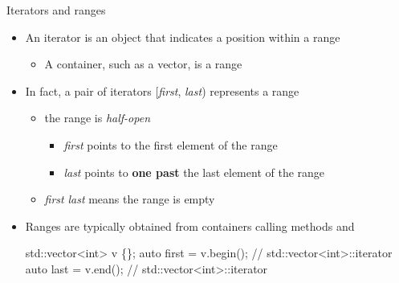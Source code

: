 \begin{frame}[fragile]{Iterators and ranges}
  \begin{itemize}
  \item An \alert{iterator} is an object that indicates a position within a
    \alert{range}
    \begin{itemize}
    \item A container, such as a vector, is a range
    \end{itemize}
  \item<2-> In fact, a pair of iterators [\textit{first}, \textit{last})
    represents a range
    \begin{itemize}
    \item the range is \textit{half-open}
      \begin{itemize}
      \item \textit{first} points to the first element of the range
      \item \textit{last} points to \textbf{one past} the last element of the
        range
      \end{itemize}
    \item \textit{first} \code{==} \textit{last} means the range is empty
    \end{itemize}


  \item<3-> Ranges are typically obtained from containers calling methods
     and 
    \begin{codeblock}
std::vector<int> v \{\ddd\};
auto first = v.begin(); // std::vector<int>::iterator
auto last = v.end();    // std::vector<int>::iterator\end{codeblock}
  \end{itemize}

\end{frame}


